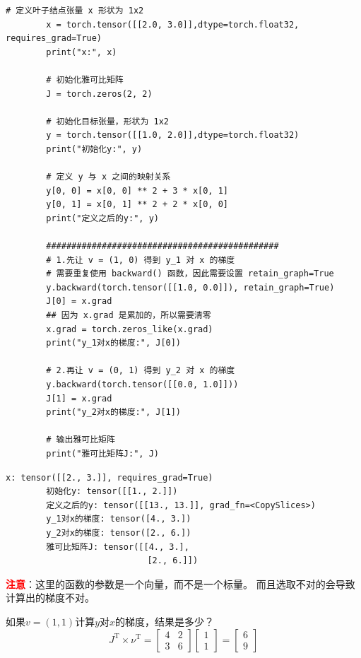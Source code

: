 \begin{enumerate}[label=\arabic*)]
\begin{lstlisting}[style=pythonstyle]
        # 定义叶子结点张量 x 形状为 1x2
        x = torch.tensor([[2.0, 3.0]],dtype=torch.float32, requires_grad=True)
        print("x:", x)

        # 初始化雅可比矩阵
        J = torch.zeros(2, 2)

        # 初始化目标张量，形状为 1x2
        y = torch.tensor([[1.0, 2.0]],dtype=torch.float32)
        print("初始化y:", y)

        # 定义 y 与 x 之间的映射关系
        y[0, 0] = x[0, 0] ** 2 + 3 * x[0, 1]
        y[0, 1] = x[0, 1] ** 2 + 2 * x[0, 0]
        print("定义之后的y:", y)

        ##############################################
        # 1.先让 v = (1, 0) 得到 y_1 对 x 的梯度
        # 需要重复使用 backward() 函数，因此需要设置 retain_graph=True
        y.backward(torch.tensor([[1.0, 0.0]]), retain_graph=True)
        J[0] = x.grad
        ## 因为 x.grad 是累加的，所以需要清零
        x.grad = torch.zeros_like(x.grad)
        print("y_1对x的梯度:", J[0])

        # 2.再让 v = (0, 1) 得到 y_2 对 x 的梯度
        y.backward(torch.tensor([[0.0, 1.0]]))
        J[1] = x.grad
        print("y_2对x的梯度:", J[1])

        # 输出雅可比矩阵
        print("雅可比矩阵J:", J)
        \end{lstlisting}
        \begin{lstlisting}[style=demostyle,numbers=none]
        x: tensor([[2., 3.]], requires_grad=True)
        初始化y: tensor([[1., 2.]])
        定义之后的y: tensor([[13., 13.]], grad_fn=<CopySlices>)
        y_1对x的梯度: tensor([4., 3.])
        y_2对x的梯度: tensor([2., 6.])
        雅可比矩阵J: tensor([[4., 3.],
                            [2., 6.]])  
        \end{lstlisting}  
        
        \textcolor{red}{\textbf{注意}}：这里的函数的参数是一个向量，而不是一个标量。
        而且选取不对的会导致计算出的梯度不对。
        \begin{example}
                \exProblem
                如果$v = (1,1)$计算$y$对$x$的梯度，结果是多少？
                \exSolution
                $$J^{\mathrm{T}}\times\nu^{\mathrm{T}}=\begin{bmatrix}4&2\\3&6\end{bmatrix}\begin{bmatrix}1\\1\end{bmatrix}=\begin{bmatrix}6\\9\end{bmatrix}$$
        \end{example}
        

\end{enumerate}
